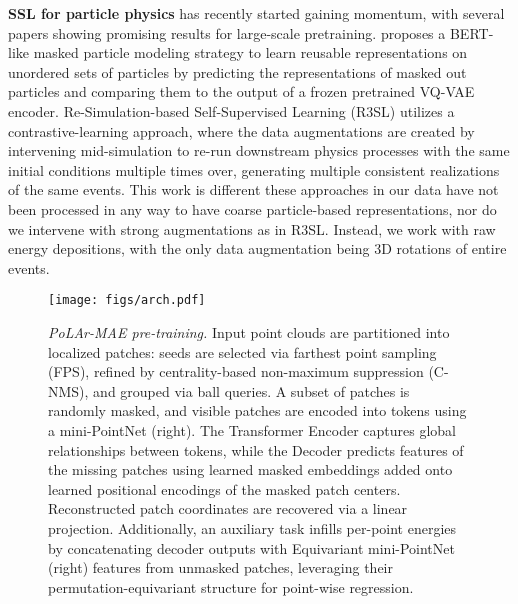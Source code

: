 \textbf{SSL for particle physics} has recently started gaining momentum, with several papers showing promising results for large-scale pretraining. \citet{golling2024maskedparticlemodelingsets} proposes a BERT-like \cite{devlin2018bert} masked particle modeling strategy to learn reusable representations on unordered sets of particles by predicting the representations of masked out particles and comparing them to the output of a frozen pretrained VQ-VAE \cite{van2017neural} encoder. Re-Simulation-based Self-Supervised Learning (R3SL) \cite{r3sl} utilizes a contrastive-learning approach, where the data augmentations are created by intervening mid-simulation to re-run downstream physics processes with the same initial conditions multiple times over, generating multiple consistent realizations of the same events. This work is different these approaches in our data have not been processed in any way to have coarse particle-based representations, nor do we intervene with strong augmentations as in R3SL. Instead, we work with raw energy depositions, with the only data augmentation being 3D rotations of entire events.

\begin{figure*}[ht!!]
    \centering
    \texttt{[image: figs/arch.pdf]}
    \vspace{-10pt}
\caption{\textit{PoLAr-MAE pre-training.} Input point clouds are partitioned into localized patches: seeds are selected via farthest point sampling (FPS), refined by centrality-based non-maximum suppression (C-NMS), and grouped via ball queries. A subset of patches is randomly masked, and visible patches are encoded into tokens using a mini-PointNet (right). The Transformer Encoder captures global relationships between tokens, while the Decoder predicts features of the missing patches using learned masked embeddings added onto learned positional encodings of the masked patch centers. Reconstructed patch coordinates are recovered via a linear projection. Additionally, an auxiliary task infills per-point energies by concatenating decoder outputs with Equivariant mini-PointNet (right) features from unmasked patches, leveraging their permutation-equivariant structure for point-wise regression.}  
\label{fig:arch}
\end{figure*}